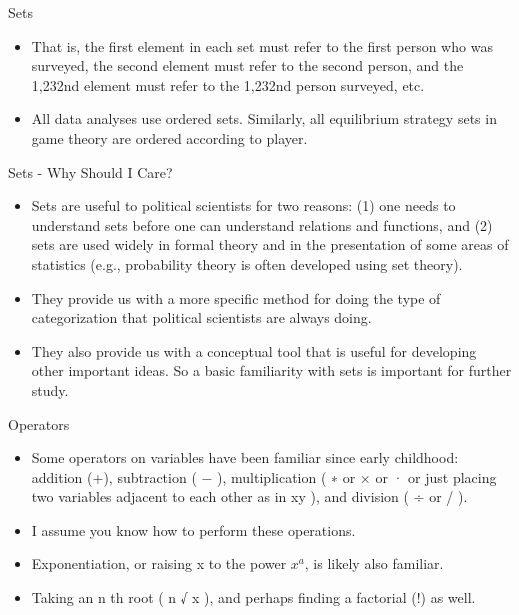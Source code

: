 \documentclass[
  ignorenonframetext,
]{beamer}
\begin{document}
\begin{frame}{Sets}
\protect\hypertarget{sets-9}{}

\begin{itemize}
\item
  That is, the first element in each set must refer to the first person
  who was surveyed, the second element must refer to the second person,
  and the 1,232nd element must refer to the 1,232nd person surveyed,
  etc.
\item
  All data analyses use ordered sets. Similarly, all equilibrium
  strategy sets in game theory are ordered according to player.
\end{itemize}

\end{frame}

\begin{frame}{Sets - Why Should I Care?}
\protect\hypertarget{sets---why-should-i-care}{}

\begin{itemize}
\item
  Sets are useful to political scientists for two reasons: (1) one needs
  to understand sets before one can understand relations and functions,
  and (2) sets are used widely in formal theory and in the presentation
  of some areas of statistics (e.g., probability theory is often
  developed using set theory).
\item
  They provide us with a more specific method for doing the type of
  categorization that political scientists are always doing.
\item
  They also provide us with a conceptual tool that is useful for
  developing other important ideas. So a basic familiarity with sets is
  important for further study.
\end{itemize}

\end{frame}

\begin{frame}{Operators}
\protect\hypertarget{operators}{}

\begin{itemize}
\item
  Some operators on variables have been familiar since early childhood:
  addition (+), subtraction ( − ), multiplication ( ∗ or × or · or just
  placing two variables adjacent to each other as in xy ), and division
  ( ÷ or / ).
\item
  I assume you know how to perform these operations.
\item
  Exponentiation, or raising x to the power \(x^{a}\), is likely also
  familiar.
\item
  Taking an n th root ( n √ x ), and perhaps finding a factorial (!) as
  well.
\end{itemize}

\end{frame}
\end{document}
